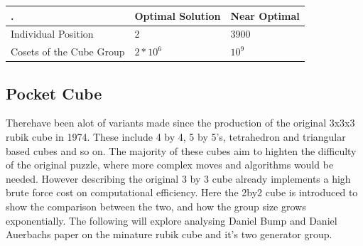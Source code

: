 \documentclass{article}
\begin{document}
\begin{center}
\label{:thistletab}
    \begin{tabular}{ |p{5cm}| p{4cm}| p{4cm}|}
    \hline
    . & Optimal Solution & Near Optimal \\ \hline
    Individual Position & 2 & 3900\\ \hline
	Cosets of the Cube Group & $2*10^6$  & $10^9$\\ \hline
    \end{tabular}
\end{center}
\newpage
\subsection{Pocket Cube}

\begin{figure}[h]
\centering
  \TwoCubeSolved%
\end{figure}

Therehave been alot of variants made since the production of the original 3x3x3 rubik cube in 1974. These include 4 by 4, 5 by 5's, tetrahedron and triangular based cubes and so on. The majority of these cubes aim to highten the difficulty of the original puzzle, where more complex moves and algorithms would be needed. However describing the original 3 by 3 cube already implements a high brute force cost on computational efficiency. Here the 2by2 cube is introduced to show the comparison between the two, and how the group size grows exponentially. The following will explore analysing Daniel Bump and Daniel Auerbachs paper on the minature rubik cube and it's two generator group.
\end{document}
